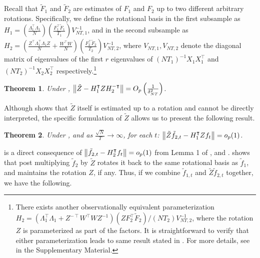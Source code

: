 \documentclass[12pt]{article}
\newtheorem{theorem}{Theorem}[section]
\newcommand*{\tran}{\intercal}
\theoremstyle{plain}
\numberwithin{equation}{section}
\begin{document}
Recall that $\tilde{F}_1$ and $\tilde{F}_2$ are estimates of $F_1$ and $F_2$ up to two different arbitrary rotations. Specifically, we define the rotational basis in the first subsample as $H_1 = \left( \frac{ \Lambda_1^\tran \Lambda_1}{N} \right) \left( \frac{F_1^\tran \tilde{F}_1}{T_1} \right) V_{NT, 1}^{-1}$, and in the second subsample as $H_2 = \left( \frac{Z^\tran \Lambda_1^\tran \Lambda_1 Z}{N} + \frac{W^\tran W}{N} \right) \left( \frac{F_2^\tran \tilde{F}_2}{T_2} \right) V_{NT, 2}^{-1}$, where $V_{NT, 1}, V_{NT, 2}$ denote the diagonal matrix of eigenvalues of the first $r$ eigenvalues of $(NT_1)^{-1}X_1 X_1^\tran$ and $(NT_2)^{-1} X_2 X_2^\tran$ respectively.\footnote{There exists another observationally equivalent parameterization \\
$H_2 = \left(\Lambda_1^\tran \Lambda_1 + Z^{-\tran}W^\tran W Z^{-1} \right) \left( ZF_2^\tran \tilde{F}_2 \right)/(NT_2) V_{NT, 2}^{-1}$, 
where the rotation $Z$ is parameterized as part of the factors. It is straightforward to verify that either parameterization leads to same result stated in . For more details, see  in the Supplementary Material.}
\begin{theorem}
\label{thm:1:Ztilde_consistency}
Under , $
\norm{\tilde{Z} - H_1^\tran Z H_2^{-\tran}} = \Opdeltasq$.  
\end{theorem}
Although  shows that $\tilde{Z}$ itself is estimated up to a rotation and cannot be directly interpreted, the specific formulation of $\tilde{Z}$ allows us to present the following result.
\begin{theorem}
\label{thm:2:Z_consistency}
Under  , and as $\frac{\sqrt{N}}{T} \to \infty$, for each $t$: $
\norm{\tilde{Z} \tilde{f}_{2, t} - H_1^\tran Z f_{t}} = o_p(1)$. 
\end{theorem}
 is a direct consequence of $\norm{\tilde{f}_{2, t} - H_2^\tran f_{t}} = o_p(1)$ from Lemma 1 of \textcite{bai_inferential_2003}, and .  shows that post multiplying $\tilde{f}_2$ by $\tilde{Z}$ rotates it back to the same rotational basis as $\tilde{f}_1$, and maintains the rotation $Z$, if any. Thus, if we combine $\tilde{f}_{1, t}$ and $\tilde{Z} \tilde{f}_{2, t}$ together, we have the following.
\end{document}
